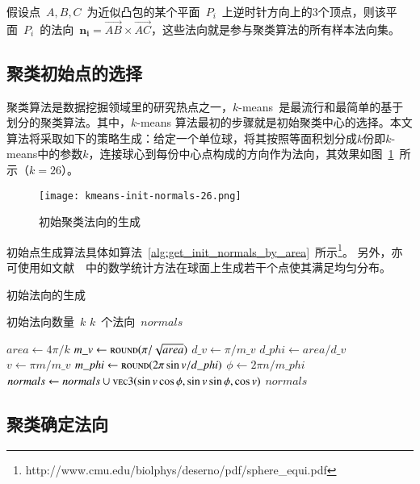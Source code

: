 假设点~$A,B,C$~为近似凸包的某个平面~$P_i$~上逆时针方向上的3个顶点，则该平面~$P_i$~的法向~$\bm{n_i}
= \overrightarrow{AB} \times
\overrightarrow{AC}$，这些法向就是参与聚类算法的所有样本法向集。

\subsection{聚类初始点的选择}
\label{subsec:initial-normals}

聚类算法是数据挖掘领域里的研究热点之一，$k$-means~是最流行和最简单的基于划分的聚类算法\cite{Jain2010}。其中，$k$-means
算法最初的步骤就是初始聚类中心的选择。本文算法将采取如下的策略生成：给定一个单位球，将其按照等面积划分成$k$份即$k$-means中的参数$k$，连接球心到每份中心点构成的方向作为法向，其效果如图~\ref{lbl:kmeans-init-normals-26}~所示（$k=26$）。

\begin{figure}[htbp]
    \centering
    \texttt{[image: kmeans-init-normals-26.png]}
    \caption{初始聚类法向的生成}
    \label{lbl:kmeans-init-normals-26}
\end{figure}
初始点生成算法具体如算法~\ref{alg:get_init_normals_by_area}~所示\footnote{http://www.cmu.edu/biolphys/deserno/pdf/sphere\_equi.pdf}。
另外，亦可使用如文献~~中的数学统计方法在球面上生成若干个点使其满足均匀分布。

\begin{algorithm}[htbp]
\small
\caption{初始法向的生成}
\label{alg:get_init_normals_by_area}
\begin{algorithmic}[1]
\Require
初始法向数量~$k$
\Ensure
$k$~个法向~$normals$

  \State $area \leftarrow 4\pi / k$
  \State $m\_v \gets \Call{round}{\pi/\sqrt{area}}$
  \State $d\_v \gets \pi/m\_v$
  \State $d\_phi \gets area/d\_v$
      \State $v \gets \pi m/m\_v$
      \State $m\_phi \gets \Call{round}{2\pi\sin{v}/d\_phi}$
          \State $\phi \gets 2\pi n/m\_phi$
          \State $normals \gets normals \cup \Call{vec3}{\sin{v}\cos{\phi},\sin{v}\sin{\phi},\cos{v}}$
      \EndFor
  \EndFor
  \State \Return $normals$
  \EndFunction
\end{algorithmic}
\end{algorithm}
 
\subsection{聚类确定法向}
\label{subsec:determ-normals}

